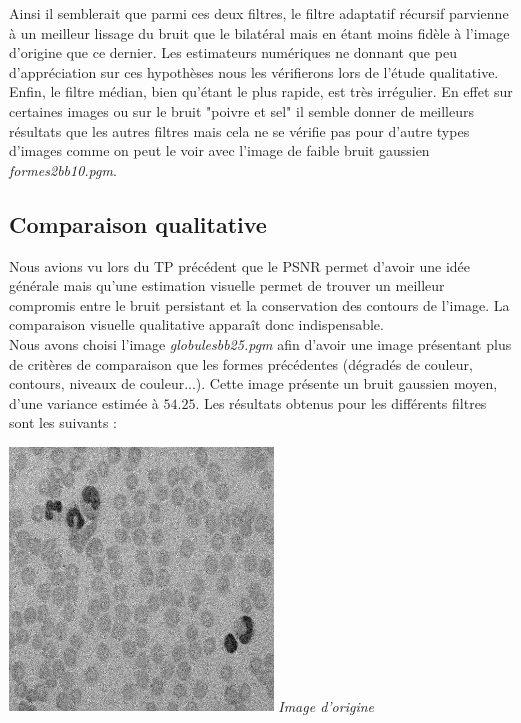 \documentclass[a4,12pt]{article}
\begin{document}
Ainsi il semblerait que parmi ces deux filtres, le filtre adaptatif récursif parvienne à un meilleur lissage du bruit que le bilatéral mais en étant moins fidèle à l'image d'origine que ce dernier. Les estimateurs numériques ne donnant que peu d'appréciation sur ces hypothèses nous les vérifierons lors de l'étude qualitative.\\

Enfin, le filtre médian, bien qu'étant le plus rapide, est très irrégulier. En effet sur certaines images ou sur le bruit "poivre et sel" il semble donner de meilleurs résultats que les autres filtres mais cela ne se vérifie pas pour d'autre types d'images comme on peut le voir avec l'image de faible bruit gaussien \textit{formes2bb10.pgm}.


\vspace{2em}

\subsection{Comparaison qualitative}

Nous avions vu lors du TP précédent que le PSNR permet d'avoir une idée générale mais qu'une estimation visuelle permet de trouver un meilleur compromis entre le bruit persistant et la conservation des contours de l'image. La comparaison visuelle qualitative apparaît donc indispensable.\\

Nous avons choisi l'image \textit{globulesbb25.pgm} afin d'avoir une image présentant plus de critères de comparaison que les formes précédentes (dégradés de couleur, contours, niveaux de couleur...). Cette image présente un bruit gaussien moyen, d'une variance estimée à $54.25$. Les résultats obtenus pour les différents filtres sont les suivants :\\


\noindent
\begin{center}
	\begin{minipage}[c]{0.45\linewidth}
		\begin{center}
			\includegraphics[width = 70mm]{./img/globOrig.jpg}
			\textit{Image d'origine}
		\end{center}
	\end{minipage}
\end{center}
\end{document}
